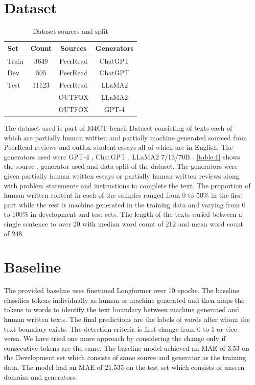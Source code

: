 \documentclass[11pt]{article}
\begin{document}
\section{Dataset}
\begin{table}[ht]
\centering
\begin{tabular}{|l|c|c|c|}
\hline
\textbf{Set} & \textbf{Count} & \textbf{Sources} & \textbf{Generators} \\
\hline
Train & 3649 & PeerRead & ChatGPT \\
\hline
Dev & 505 & PeerRead & ChatGPT \\
\hline
Test & 11123 & PeerRead & LLaMA2 \\
\cline{3-4}
&  & OUTFOX & LLaMA2 \\
\cline{3-4}
&  & OUTFOX & GPT-4 \\
\hline
\end{tabular}
\caption{Dataset sources and split}
\label{table:1}
\end{table}
The dataset used is part of M4GT-bench  Dataset\cite{wang2024m4gtbench} consisting of texts each of which are partially human written and partially machine generated sourced from PeerRead reviews and outfox student essays \cite{koike2023outfox} all of which are in English. The generators used were GPT-4\cite{openai2024gpt4} , ChatGPT , LLaMA2 7/13/70B \cite{touvron2023llama}. \autoref{table:1} shows the source , generator used and data split of the dataset. The generators were given partially human written essays or partially human written reviews along with problem statements and instructions to complete the text. The proportion of human written content in each of the samples ranged from 0 to 50\% in the first part while the rest is machine generated in the training data and varying from 0 to 100\% in development and test sets. The length of the texts varied between a single sentence to over 20 with median word count of 212 and mean word count of 248.

\section{Baseline}
The provided baseline uses finetuned Longformer over 10 epochs. The baseline classifies tokens individually as human or machine generated and then maps the tokens to words to identify the text boundary between machine generated and human written texts. The final predictions are the labels of words after whom the text boundary exists. The detection criteria is first change from 0 to 1 or vice versa. We have tried one more approach by considering the change only if consecutive tokens are the same. The baseline model achieved an MAE of 3.53 on the Development set which consists of same source and generator as the training data. The model had an MAE of 21.535 on the test set which consists of unseen domains and generators. 
\end{document}
